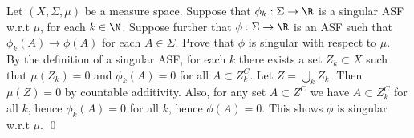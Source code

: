 \begin{hwsol}
Let $(X,\Sigma,\mu)$ be a measure space. Suppose that $\phi_k: \Sigma \to \R$ is a singular ASF w.r.t $\mu$, for each $k \in \N$. Suppose further that $\phi: \Sigma \to \R$ is an ASF such that $\phi_k(A) \to \phi(A)$ for each $A \in \Sigma$. Prove that $\phi$ is singular with respect to $\mu$. \\

\pf  By the definition of a singular ASF, for each $k$ there exists a set $Z_k \subset X$ such that $\mu(Z_k)= 0$ and $\phi_k(A)= 0$ for all $A\subset Z_k^C$. Let $Z= \bigcup_k Z_k$. Then $\mu(Z)= 0$ by countable additivity. Also, for any set $A \subset Z^C$ we have $A \subset Z_k^C$ for all $k$, hence $\phi_k(A)= 0$ for all $k$, hence $\phi(A)= 0$. This shows $\phi$ is singular w.r.t $\mu$. \qed \\
\end{hwsol}


